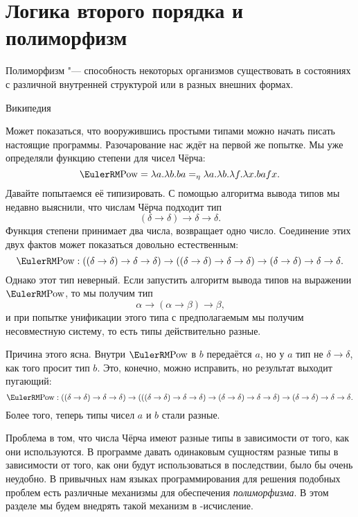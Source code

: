 \section{\texorpdfstring{Логика второго порядка и полиморфизм}{Second-order logic and polymorphism}}

\epigraph{Полиморфизм "--- способность некоторых организмов
существовать в состояниях с различной внутренней структурой или в разных внешних формах.}
{Википедия}

Может показаться, что вооружившись простыми типами можно начать писать настоящие программы.
Разочарование нас ждёт на первой же попытке.
Мы уже определяли функцию степени для чисел Чёрча:
\[
    \func{Pow} = \lambda{}a.\lambda{}b.b a =_\eta \lambda{}a.\lambda{}b.\lambda{}f.\lambda{}x.b a f x\text{.}
\]
Давайте попытаемся её типизировать.
С помощью алгоритма вывода типов мы недавно выяснили, что числам Чёрча подходит тип
\[
    (\delta\to\delta)\to\delta\to\delta\text{.}
\]
Функция степени принимает два числа, возвращает одно число.
Соединение этих двух фактов может показаться довольно естественным:
\[
    \func{Pow}:((\delta\to\delta)\to\delta\to\delta)\to((\delta\to\delta)\to\delta\to\delta)\to(\delta\to\delta)\to\delta\to\delta\text{.}
\]
Однако этот тип неверный. Если запустить алгоритм вывода типов на выражении $\func{Pow}$, то мы получим тип
\[
    \alpha \to (\alpha \to \beta) \to \beta\text{,}
\]
и при попытке унификации этого типа с предполагаемым мы получим несовместную систему, то есть типы действительно разные.

Причина этого ясна.
Внутри $\func{Pow}$ в $b$ передаётся $a$, но у $a$ тип не $\delta \to \delta$, как того просит тип $b$.
Это, конечно, можно исправить, но результат выходит пугающий:
\[
    \func{Pow}:((\delta\to\delta)\to\delta\to\delta)\to(((\delta\to\delta)\to\delta\to\delta)\to(\delta\to\delta)\to\delta\to\delta)\to(\delta\to\delta)\to\delta\to\delta\text{.}
\]
Более того, теперь типы чисел $a$ и $b$ стали разные.

Проблема в том, что числа Чёрча имеют разные типы в зависимости от того, как они используются.
В программе давать одинаковым сущностям разные типы в зависимости от того,
как они будут использоваться в последствии, было бы очень неудобно.
В привычных нам языках программирования для решения подобных проблем есть различные механизмы для обеспечения \emph{полиморфизма}.
В этом разделе мы будем внедрять такой механизм в \textlambda-исчисление.


